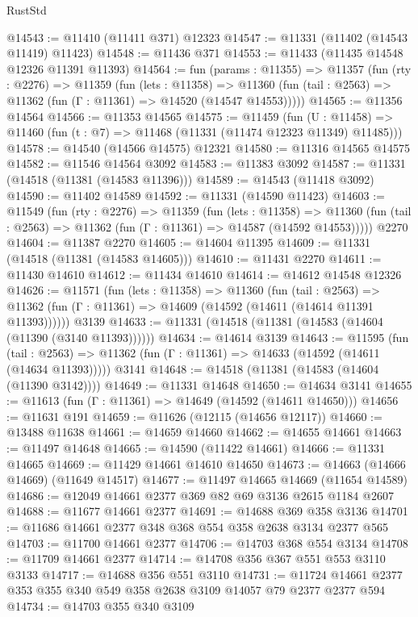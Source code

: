 \begin{lexlean}{RustStd}
\begin{coremodule}
@14543 := @11410 (@11411 @371) @12323
@14547 := @11331 (@11402 (@14543 @11419) @11423)
@14548 := @11436 @371
@14553 := @11433 (@11435 @14548 @12326 @11391 @11393)
@14564 := fun (params : @11355) =>
  @11357
    (fun (rty : @2276) =>
    @11359
      (fun (lets : @11358) =>
      @11360 (fun (tail : @2563) => @11362 (fun (Γ : @11361) => @14520 (@14547 @14553)))))
@14565 := @11356 @14564
@14566 := @11353 @14565
@14575 := @11459
    (fun (U : @11458) => @11460 (fun (t : @7) => @11468 (@11331 (@11474 @12323 @11349) @11485)))
@14578 := @14540 (@14566 @14575) @12321
@14580 := @11316 @14565 @14575
@14582 := @11546 @14564 @3092
@14583 := @11383 @3092
@14587 := @11331 (@14518 (@11381 (@14583 @11396)))
@14589 := @14543 (@11418 @3092)
@14590 := @11402 @14589
@14592 := @11331 (@14590 @11423)
@14603 := @11549
    (fun (rty : @2276) =>
    @11359
      (fun (lets : @11358) =>
      @11360 (fun (tail : @2563) => @11362 (fun (Γ : @11361) => @14587 (@14592 @14553)))))
    @2270
@14604 := @11387 @2270
@14605 := @14604 @11395
@14609 := @11331 (@14518 (@11381 (@14583 @14605)))
@14610 := @11431 @2270
@14611 := @11430 @14610
@14612 := @11434 @14610
@14614 := @14612 @14548 @12326
@14626 := @11571
    (fun (lets : @11358) =>
    @11360
      (fun (tail : @2563) =>
      @11362 (fun (Γ : @11361) => @14609 (@14592 (@14611 (@14614 @11391 @11393))))))
    @3139
@14633 := @11331 (@14518 (@11381 (@14583 (@14604 (@11390 (@3140 @11393))))))
@14634 := @14614 @3139
@14643 := @11595
    (fun (tail : @2563) => @11362 (fun (Γ : @11361) => @14633 (@14592 (@14611 (@14634 @11393)))))
    @3141
@14648 := @14518 (@11381 (@14583 (@14604 (@11390 @3142))))
@14649 := @11331 @14648
@14650 := @14634 @3141
@14655 := @11613 (fun (Γ : @11361) => @14649 (@14592 (@14611 @14650)))
@14656 := @11631 @191
@14659 := @11626 (@12115 (@14656 @12117))
@14660 := @13488 @11638
@14661 := @14659 @14660
@14662 := @14655 @14661
@14663 := @11497 @14648
@14665 := @14590 (@11422 @14661)
@14666 := @11331 @14665
@14669 := @11429 @14661 @14610 @14650
@14673 := @14663 (@14666 @14669) (@11649 @14517)
@14677 := @11497 @14665 @14669 (@11654 @14589)
@14686 := @12049 @14661 @2377 @369 @82 @69 @3136 @2615 @1184 @2607
@14688 := @11677 @14661 @2377
@14691 := @14688 @369 @358 @3136
@14701 := @11686 @14661 @2377 @348 @368 @554 @358 @2638 @3134 @2377 @565
@14703 := @11700 @14661 @2377
@14706 := @14703 @368 @554 @3134
@14708 := @11709 @14661 @2377
@14714 := @14708 @356 @367 @551 @553 @3110 @3133
@14717 := @14688 @356 @551 @3110
@14731 := @11724 @14661 @2377 @353 @355 @340 @549 @358 @2638 @3109 @14057 @79 @2377 @2377 @594
@14734 := @14703 @355 @340 @3109

\end{coremodule}
\end{lexlean}
